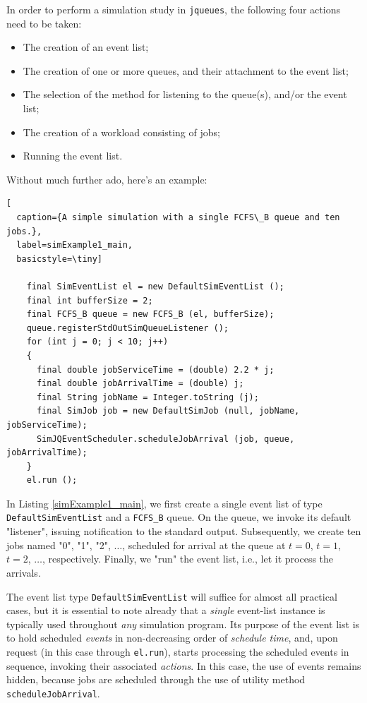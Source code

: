 \documentclass[12pt]{book}
\begin{document}
In order to perform a simulation study in \lstinline|jqueues|,
  the following four actions need to be taken:
\begin{itemize}
\item The creation of an event list;
\item The creation of one or more queues, and their attachment to the event list;
\item The selection of the method for listening to the queue(s), and/or the event list;
\item The creation of a workload consisting of jobs;
\item Running the event list.
\end{itemize}
Without much further ado, here's an example:

\begin{lstfloat}
\begin{lstlisting}[
  caption={A simple simulation with a single FCFS\_B queue and ten jobs.},
  label=simExample1_main,
  basicstyle=\tiny]

    final SimEventList el = new DefaultSimEventList ();
    final int bufferSize = 2;
    final FCFS_B queue = new FCFS_B (el, bufferSize);
    queue.registerStdOutSimQueueListener ();
    for (int j = 0; j < 10; j++)
    {
      final double jobServiceTime = (double) 2.2 * j;
      final double jobArrivalTime = (double) j;
      final String jobName = Integer.toString (j);
      final SimJob job = new DefaultSimJob (null, jobName, jobServiceTime);
      SimJQEventScheduler.scheduleJobArrival (job, queue, jobArrivalTime);
    }
    el.run ();

\end{lstlisting}
\end{lstfloat}

In Listing \ref{simExample1_main},
  we first create a single event list of type \lstinline|DefaultSimEventList|
  and a \lstinline|FCFS_B| queue.
On the queue, we invoke its default "listener",
  issuing notification to the standard output.
Subsequently,
  we create ten jobs named "0", "1", "2", $\ldots$,
  scheduled for arrival at the queue
  at $t=0$, $t=1$, $t=2$, $\ldots$,
  respectively.
Finally, we "run" the event list, i.e.,
  let it process the arrivals.

The event list type
  \lstinline|DefaultSimEventList|
  will suffice for almost all practical cases,
  but it is essential to note already that
  a {\em single\/} event-list instance is typically used
  throughout {\em any\/} simulation program.
Its purpose of the event list is to hold scheduled {\em events\/}
  in non-decreasing order of {\em schedule time},
  and, upon request (in this case through \lstinline|el.run|),
  starts processing the scheduled events in sequence,
  invoking their associated {\em actions}.
In this case,
  the use of events remains hidden,
  because jobs are scheduled through the use of utility method
  \lstinline|scheduleJobArrival|.
\end{document}
